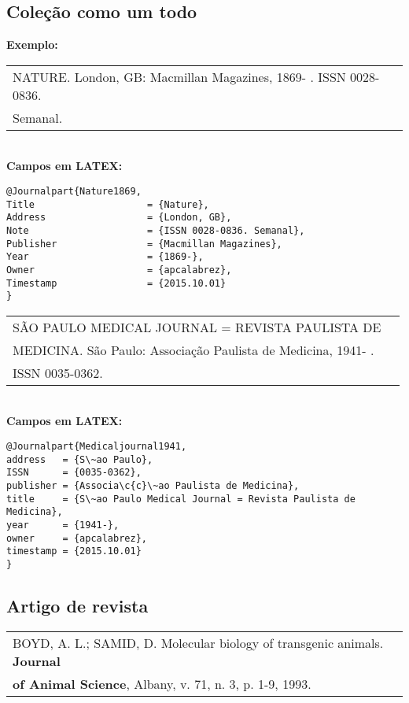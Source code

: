\subsection{Cole\c{c}\~ao como um todo}

\textbf{Exemplo:} \\

\begin{tabular}{|l|c|} \hline
	NATURE. London, GB: Macmillan Magazines, 1869- . ISSN
	0028-0836.\\Semanal.\\\hline
\end{tabular} \\

\textbf{Campos em LATEX:} 

\begin{verbatim}
@Journalpart{Nature1869,
Title                    = {Nature},
Address                  = {London, GB},
Note                     = {ISSN 0028-0836. Semanal},
Publisher                = {Macmillan Magazines},
Year                     = {1869-},
Owner                    = {apcalabrez},
Timestamp                = {2015.10.01}
}
\end{verbatim}

\begin{tabular}{|l|c|} \hline
	S\~AO PAULO MEDICAL JOURNAL = REVISTA PAULISTA DE\\MEDICINA.  S\~ao Paulo: Associa\c{c}\~ao Paulista de Medicina, 1941- . \\ISSN 0035-0362.\\\hline
\end{tabular} \\

\textbf{Campos em LATEX:} 

\begin{verbatim}
@Journalpart{Medicaljournal1941,
address   = {S\~ao Paulo},
ISSN      = {0035-0362},
publisher = {Associa\c{c}\~ao Paulista de Medicina},
title     = {S\~ao Paulo Medical Journal = Revista Paulista de Medicina},
year      = {1941-},
owner     = {apcalabrez},
timestamp = {2015.10.01}
}
\end{verbatim}


\subsection{Artigo de revista}


\begin{tabular}{|l|c|} \hline
	BOYD, A. L.; SAMID, D. Molecular biology of transgenic animals. \textbf{Journal } \\ \textbf{of  Animal Science}, Albany, v. 71, n. 3, p. 1-9, 1993.
	\\\hline
\end{tabular} \\

